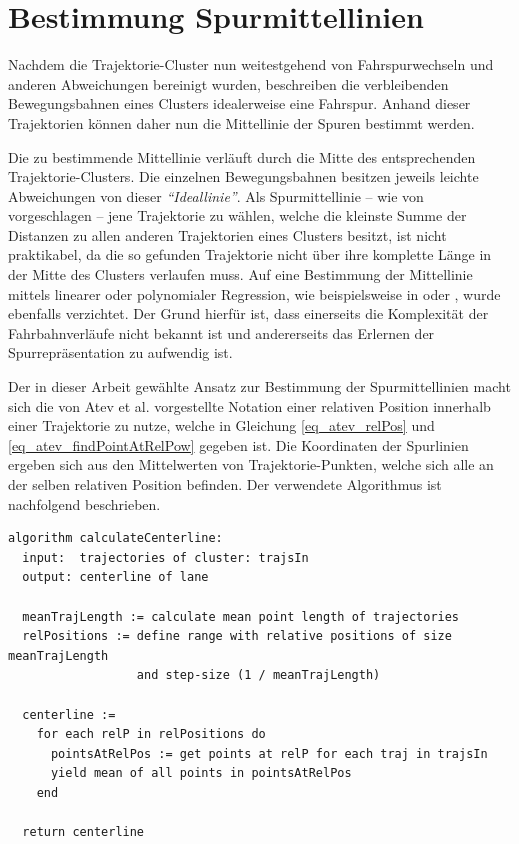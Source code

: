\section{Bestimmung Spurmittellinien}
\label{sec:real2_define_lane_centerline}

Nachdem die Trajektorie-Cluster nun weitestgehend von Fahrspurwechseln und anderen Abweichungen bereinigt
wurden, beschreiben die verbleibenden Bewegungsbahnen eines Clusters idealerweise eine Fahrspur.
Anhand dieser Trajektorien können daher nun die Mittellinie der Spuren bestimmt werden.

Die zu bestimmende Mittellinie verläuft durch die Mitte des entsprechenden
Trajektorie-Clusters. Die einzelnen Bewegungsbahnen besitzen jeweils leichte Abweichungen von dieser
\textit{``Ideallinie''}.
Als Spurmittellinie -- wie von \cite{Hu2005} vorgeschlagen -- jene Trajektorie zu wählen, welche die
kleinste Summe der Distanzen zu allen anderen Trajektorien eines Clusters besitzt, ist nicht praktikabel,
da die so gefunden Trajektorie nicht über ihre komplette Länge in der Mitte des Clusters verlaufen muss.
Auf eine Bestimmung der Mittellinie mittels linearer oder polynomialer Regression, wie beispielsweise in
\cite[]{Chen2014} oder \cite[]{Melo2006},
wurde ebenfalls verzichtet. Der Grund hierfür ist, dass einerseits die Komplexität der Fahrbahnverläufe
nicht bekannt ist und andererseits das Erlernen der Spurrepräsentation zu aufwendig ist.

Der in dieser Arbeit gewählte Ansatz zur Bestimmung der Spurmittellinien macht sich die von Atev et al.
vorgestellte Notation einer relativen Position innerhalb einer Trajektorie zu nutze, welche in
Gleichung \ref{eq_atev_relPos} und \ref{eq_atev_findPointAtRelPow} gegeben ist.
Die Koordinaten der Spurlinien ergeben sich aus den Mittelwerten von Trajektorie-Punkten, welche sich
alle an der selben relativen Position befinden. Der verwendete Algorithmus ist nachfolgend beschrieben.
\begin{lstlisting}[caption=Pseudocode Cluster Post-Processing, language=Pseudo, label=lst:pseudo_post_processing]
algorithm calculateCenterline:
  input:  trajectories of cluster: trajsIn
  output: centerline of lane

  meanTrajLength := calculate mean point length of trajectories
  relPositions := define range with relative positions of size meanTrajLength
                  and step-size (1 / meanTrajLength)

  centerline :=
    for each relP in relPositions do
      pointsAtRelPos := get points at relP for each traj in trajsIn
      yield mean of all points in pointsAtRelPos
    end

  return centerline
\end{lstlisting}

